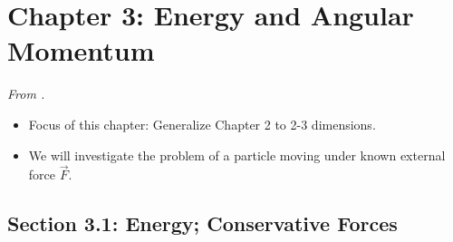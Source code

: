 \documentclass[../notes.tex]{subfiles}
\begin{document}
\section{Chapter 3: Energy and Angular Momentum}
\emph{From \textcite{bib:KibbleBerkshire}.}
\begin{itemize}
    \item {}Focus of this chapter: Generalize Chapter 2 to 2-3 dimensions.
    \item We will investigate the problem of a particle moving under known external force $\vec{F}$. 
\end{itemize}


\subsection*{Section 3.1: Energy; Conservative Forces}
\end{document}

